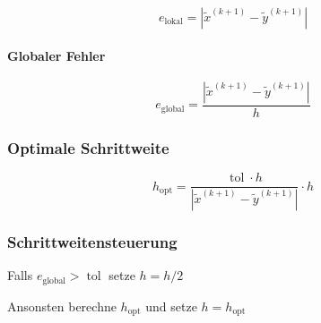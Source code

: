 \documentclass[a4paper, twoside]{article}
\begin{document}
\[e_{\text{lokal}} = |\tilde{x}^{(k+1)} - \tilde{y}^{(k+1)}|\]

\paragraph{Globaler Fehler}

\[e_{\text{global}} = \frac{|\tilde{x}^{(k+1)} - \tilde{y}^{(k+1)}|}{h}\]

\subsubsection{Optimale Schrittweite}

\[h_{\text{opt}} = \frac{\operatorname{tol} \cdot h}{|\tilde{x}^{(k+1)} - \tilde{y}^{(k+1)}|} \cdot h\]

\subsubsection{Schrittweitensteuerung}

Falls \(e_{\text{global}} > \operatorname{tol}\) setze \(h = h/2\)

Ansonsten berechne \(h_{\text{opt}}\) und setze \(h = h_{\text{opt}}\)


\end{document}
